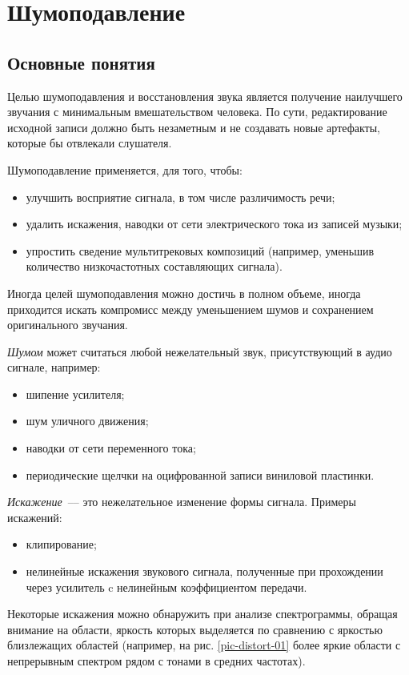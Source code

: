 \documentclass[oneside, final, 14pt]{extreport}
\begin{document}
\setcounter{chapter}{4}
\chapter{Шумоподавление}
\section{Основные понятия}

Целью шумоподавления и восстановления звука является получение наилучшего звучания с минимальным вмешательством человека. По сути, редактирование исходной записи должно быть незаметным и не создавать новые артефакты, которые бы отвлекали слушателя.

Шумоподавление применяется, для того, чтобы:
\begin{itemize}
  \item улучшить восприятие сигнала, в том числе различимость речи;
  \item удалить искажения, наводки от сети электрического тока из записей музыки;
  \item упростить сведение мультитрековых композиций (например, уменьшив количество низкочастотных составляющих сигнала).
\end{itemize}

Иногда целей шумоподавления можно достичь в полном объеме, иногда приходится искать компромисс между уменьшением шумов и сохранением оригинального звучания.

\textit{Шумом} может считаться любой нежелательный звук, присутствующий в аудио сигнале, например:
\begin{itemize}
\item шипение усилителя;
\item шум уличного движения;
\item наводки от сети переменного тока;
\item периодические щелчки на оцифрованной записи виниловой пластинки.
\end{itemize}

\textit{Искажение}~--– это нежелательное изменение формы сигнала. Примеры искажений:
\begin{itemize}
\item клипирование;
\item нелинейные искажения звукового сигнала, полученные при прохождении через усилитель c нелинейным коэффициентом передачи.
\end{itemize}

Некоторые искажения можно обнаружить при анализе спектрограммы, обращая внимание на области, яркость которых выделяется по сравнению с яркостью близлежащих областей (например, на рис. \ref{pic-distort-01} более яркие области с непрерывным спектром рядом с тонами в средних частотах).
\end{document}
